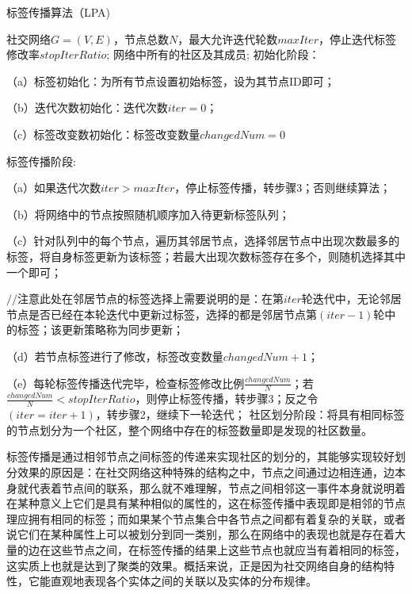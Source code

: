 \begin{algorithm}[htb]  
  \caption{标签传播算法（LPA)}  
  \label{alg:LPA}  
  \begin{algorithmic}[1]  
    \Require
      社交网络$G=(V,E)$，节点总数$N$，最大允许迭代轮数$maxIter$，停止迭代标签修改率$stopIterRatio$;  
    \Ensure  
      网络中所有的社区及其成员;  
    \State  初始化阶段：

    （a）标签初始化：为所有节点设置初始标签，设为其节点ID即可；

    （b）迭代次数初始化：迭代次数$iter = 0$；

    （c）标签改变数初始化：标签改变数量$changedNum = 0$

    \State  标签传播阶段:
      
    （a）如果迭代次数$iter > maxIter$，停止标签传播，转步骤3；否则继续算法；
    
    （b）将网络中的节点按照随机顺序加入待更新标签队列；
    
    （c）针对队列中的每个节点，遍历其邻居节点，选择邻居节点中出现次数最多的标签，将自身标签更新为该标签；若最大出现次数标签存在多个，则随机选择其中一个即可；
    
    $//$注意此处在邻居节点的标签选择上需要说明的是：在第$iter$轮迭代中，无论邻居节点是否已经在本轮迭代中更新过标签，选择的都是邻居节点第$(iter - 1)$轮中的标签；该更新策略称为同步更新；
    
    （d）若节点标签进行了修改，标签改变数量$changedNum + 1$；
    
    （e）每轮标签传播迭代完毕，检查标签修改比例$\frac{changedNum}{N}$；若$\frac{changedNum}{N} < stopIterRatio$，则停止标签传播，转步骤3；反之令$(iter = iter+ 1)$，转步骤2，继续下一轮迭代；
    \State  社区划分阶段：将具有相同标签的节点划分为一个社区，整个网络中存在的标签数量即是发现的社区数量。
  \end{algorithmic}  
\end{algorithm} 

标签传播是通过相邻节点之间标签的传递来实现社区的划分的，其能够实现较好划分效果的原因是：在社交网络这种特殊的结构之中，节点之间通过边相连通，边本身就代表着节点间的联系，那么就不难理解，节点之间相邻这一事件本身就说明着在某种意义上它们是具有某种相似的属性的，这在标签传播中表现即是相邻的节点理应拥有相同的标签；而如果某个节点集合中各节点之间都有着复杂的关联，或者说它们在某种属性上可以被划分到同一类别，那么在网络中的表现也就是存在着大量的边在这些节点之间，在标签传播的结果上这些节点也就应当有着相同的标签，这实质上也就是达到了聚类的效果。概括来说，正是因为社交网络自身的结构特性，它能直观地表现各个实体之间的关联以及实体的分布规律。

